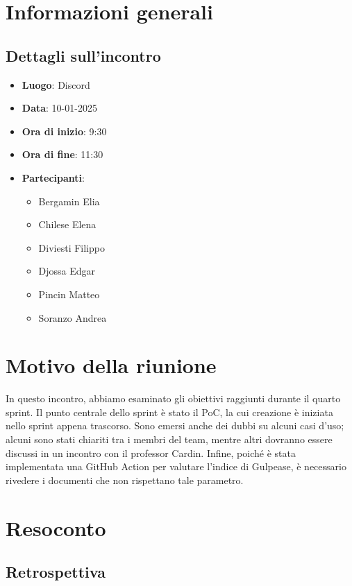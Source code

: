 \section{Informazioni generali}
\subsection{Dettagli sull'incontro}
\begin{itemize}
    \item \textbf{Luogo}: Discord
    \item \textbf{Data}: 10-01-2025
    \item \textbf{Ora di inizio}: 9:30
    \item \textbf{Ora di fine}: 11:30
    \item \textbf{Partecipanti}:
    \begin{itemize}
        \item Bergamin Elia
        \item Chilese Elena
        \item Diviesti Filippo
        \item Djossa Edgar
        \item Pincin Matteo 
        \item Soranzo Andrea  
    \end{itemize}
\end{itemize}

\section{Motivo della riunione}
In questo incontro, abbiamo esaminato gli obiettivi raggiunti durante il quarto sprint. 
Il punto centrale dello sprint è stato il PoC, la cui creazione è iniziata nello sprint appena trascorso. 
Sono emersi anche dei dubbi su alcuni casi d'uso; alcuni sono stati chiariti tra i membri del team, mentre altri dovranno essere discussi in un incontro con il professor Cardin. 
Infine, poiché è stata implementata una GitHub Action per valutare l'indice di Gulpease, è necessario rivedere i documenti che non rispettano tale parametro.

\section{Resoconto}
\subsection{Retrospettiva}
